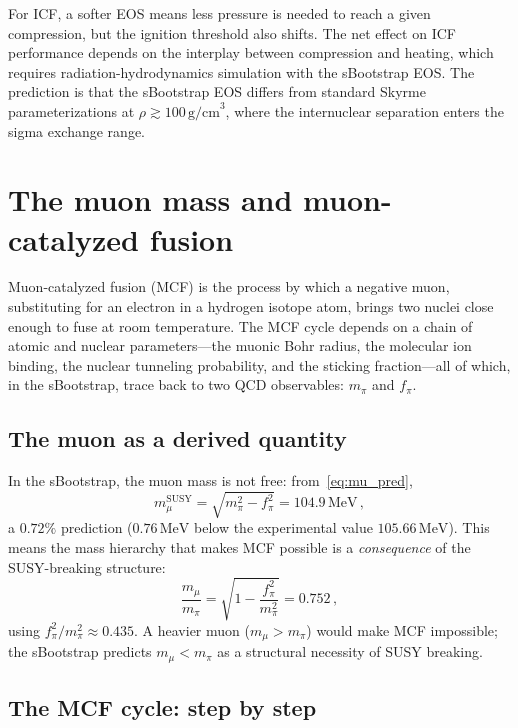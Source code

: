 \documentclass[12pt,a4paper]{article}
\newcommand{\MeV}{\,\text{MeV}}
\newcommand{\fpi}{f_\pi}
\begin{document}
For ICF, a softer EOS means less pressure is needed to reach a given
compression, but the ignition threshold also shifts.  The net effect
on ICF performance depends on the interplay between compression and
heating, which requires radiation-hydrodynamics simulation with the
sBootstrap EOS.  The prediction is that the sBootstrap EOS differs
from standard Skyrme parameterizations at $\rho \gtrsim
100\,\text{g/cm}^3$, where the internuclear separation enters the
sigma exchange range.

\section{The muon mass and muon-catalyzed fusion}
\label{sec:muon}

Muon-catalyzed fusion (MCF) is the process by which a negative muon,
substituting for an electron in a hydrogen isotope atom, brings two
nuclei close enough to fuse at room temperature.  The MCF cycle
depends on a chain of atomic and nuclear parameters---the muonic Bohr
radius, the molecular ion binding, the nuclear tunneling probability,
and the sticking fraction---all of which, in the sBootstrap, trace
back to two QCD observables: $m_\pi$ and $\fpi$.

\subsection{The muon as a derived quantity}

In the sBootstrap, the muon mass is not free: from~\eqref{eq:mu_pred},
\begin{equation}
  m_\mu^{\text{SUSY}} = \sqrt{m_\pi^2 - \fpi^2} = 104.9\MeV\,,
\end{equation}
a $0.72\%$ prediction ($0.76\MeV$ below the experimental value
$105.66\MeV$).  This means the mass hierarchy that makes MCF
possible is a \emph{consequence} of the SUSY-breaking structure:
\begin{equation}
  \frac{m_\mu}{m_\pi} = \sqrt{1 - \frac{\fpi^2}{m_\pi^2}}
  = 0.752\,,
\end{equation}
using $\fpi^2/m_\pi^2 \approx 0.435$.
A heavier muon ($m_\mu > m_\pi$) would make MCF
impossible; the sBootstrap predicts $m_\mu < m_\pi$
as a structural necessity of SUSY breaking.

\subsection{The MCF cycle: step by step}
\end{document}
